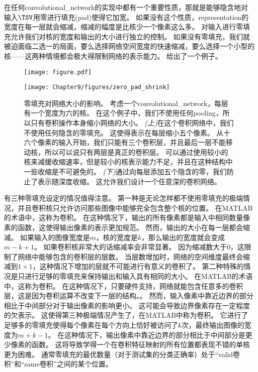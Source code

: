 在任何\gls{convolutional_network}的实现中都有一个重要性质，那就是能够隐含地对输入$\TSV$用零进行填充(pad)使得它加宽。
如果没有这个性质，\gls{representation}的宽度在每一层就会缩减，缩减的幅度是比核少一个像素这么多。
对输入进行零填充允许我们对核的宽度和输出的大小进行独立的控制。
如果没有零填充，我们就被迫面临二选一的局面，要么选择网络空间宽度的快速缩减，要么选择一个小型的核——这两种情境都会极大得限制网络的表示能力。
给出了一个例子。
\begin{figure}[!htb]
\ifOpenSource
\centerline{\texttt{[image: figure.pdf]}}
\else
\centerline{\texttt{[image: Chapter9/figures/zero\_pad\_shrink]}}
\fi
\caption{零填充对网络大小的影响。
考虑一个\gls{convolutional_network}，每层有一个宽度为六的核。 
在这个例子中，我们不使用任何\gls{pooling}，所以只有卷积操作本身缩小网络的大小。
\emph{(上)}在这个卷积网络中，我们不使用任何隐含的零填充。
这使得表示在每层缩小五个像素。
从十六个像素的输入开始，我们只能有三个卷积层，并且最后一层不能移动核，所以可以说只有两层是真正的卷积层。
可以通过使用较小的核来减缓收缩速率，但是较小的核表示能力不足，并且在这种结构中一些收缩是不可避免的。
\emph{(下)}通过向每层添加五个隐含的零，我们防止了表示随深度收缩。
这允许我们设计一个任意深的卷积网络。}
\label{fig:chap9_zero_pad_shrink}
\end{figure}

有三种零填充设定的情况值得注意。
第一种是无论怎样都不使用零填充的极端情况，并且卷积核只允许访问那些图像中能够完全包含整个核的位置。
在MATLAB的术语中，这称为卷积。
在这种情况下，输出的所有像素都是输入中相同数量像素的函数，这使得输出像素的表示更加规范。
然而，输出的大小在每一层都会缩减。
如果输入的图像宽度是$m$，核的宽度是$k$，那么输出的宽度就会变成$m-k+1$。
如果卷积核非常大的话缩减率会非常显著。
因为缩减数大于0，这限制了网络中能够包含的卷积层的层数。
当层数增加时，网络的空间维度最终会缩减到$1\times 1$，这种情况下增加的层就不可能进行有意义的卷积了。
第二种特殊的情况是只进行足够的零填充来保持输出和输入具有相同的大小。
在MATLAB的术语中，这称为卷积。
在这种情况下，只要硬件支持，网络就能包含任意多的卷积层，这是因为卷积运算不改变下一层的结构。。
然而，输入像素中靠近边界的部分相比于中间部分对于输出像素的影响更小。
这可能会导致边界像素存在一定程度的欠表示。
这使得第三种极端情况产生了，在MATLAB中称为卷积。
它进行了足够多的零填充使得每个像素在每个方向上恰好被访问了$k$次，最终输出图像的宽度为$m+k-1$。%
在这种情况下，输出像素中靠近边界的部分相比于中间部分是更少像素的函数。
这将导致学得一个在卷积特征映射的所有位置都表现不错的单核更为困难。
通常零填充的最优数量（对于测试集的分类正确率）处于``\gls{valid}卷积''和``\gls{same}卷积''之间的某个位置。

